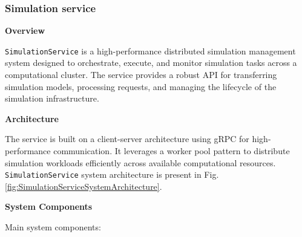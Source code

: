 \subsubsection{Simulation service}
\textbf{Overview}

\texttt{SimulationService} is a high-performance distributed simulation management system designed to orchestrate, execute, and monitor simulation tasks across a computational cluster. The service provides a robust API for transferring simulation models, processing requests, and managing the lifecycle of the simulation infrastructure.

\bigskip
\textbf{Architecture}

The service is built on a client-server architecture using gRPC for high-performance communication. It leverages a worker pool pattern to distribute simulation workloads efficiently across available computational resources. \texttt{SimulationService} system architecture is present in Fig. \ref{fig:SimulationServiceSystemArchitecture}. 

\bigskip
\textbf{System Components}

\bigskip
Main system components:

